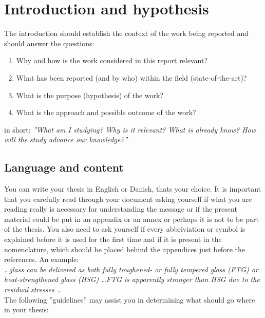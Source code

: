 \chapter{Introduction and hypothesis}

The introduction should establish the context of the work being reported and should answer the questions:

\begin{enumerate}
  \item Why and how is the work considered in this report relevant?
  \item What has been reported (and by who) within the field (state-of-the-art)?
  \item What is the purpose (hypothesis) of the work?
  \item What is the approach and possible outcome of the work?
\end{enumerate}

\noindent in short: \emph{''What am I studying? Why is it relevant? What is already know? How will the study advance our knowledge?''}\\

\section{Language and content}
You can write your thesis in English or Danish, thats your choice. It is important that you carefully read through your document asking yourself if what you are reading really is necessary for understanding the message or if the present material could be put in an appendix or an annex or perhaps it is not to be part of the thesis. You also need to ask yourself if every abbriviation or symbol is explained before it is used for the first time and if it is present in the nomenclature, which should be placed behind the appendices just before the references. An example:\\
\emph{\ldots glass can be delivered as both fully toughened- or fully tempered glass (FTG) or heat-strengthened glass (HSG) \ldots FTG is apparently stronger than HSG due to the residual stresses \ldots}\\

The following ''guidelines'' may assist you in determining what should go where in your thesis:

